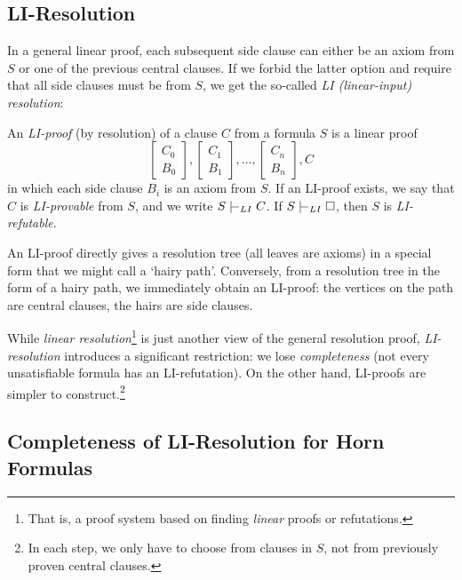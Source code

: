 \subsection{LI-Resolution}

In a general linear proof, each subsequent side clause can either be an axiom from $S$ or one of the previous central clauses. If we forbid the latter option and require that all side clauses must be from $S$, we get the so-called \emph{LI (linear-input) resolution}:
    
\begin{definition}[LI-Proof]
    An \emph{LI-proof} (by resolution) of a clause $C$ from a formula $S$ is a linear proof 
    $$
    \begin{bmatrix}
        C_0 \\
        B_0
    \end{bmatrix},
    \begin{bmatrix}
        C_1 \\
        B_1
    \end{bmatrix},\dots,
    \begin{bmatrix}
        C_n \\
        B_n
    \end{bmatrix},
    C
    $$
    in which each side clause $B_i$ is an axiom from $S$. If an LI-proof exists, we say that $C$ is \emph{LI-provable} from $S$, and we write $S\proves_{LI}C$. If $S\proves_{LI}\square$, then $S$ is \emph{LI-refutable}.
\end{definition}

\begin{remark}
    An LI-proof directly gives a resolution tree (all leaves are axioms) in a special form that we might call a `hairy path'. Conversely, from a resolution tree in the form of a hairy path, we immediately obtain an LI-proof: the vertices on the path are central clauses, the hairs are side clauses.
\end{remark}

While \emph{linear resolution}\footnote{That is, a proof system based on finding \emph{linear} proofs or refutations.} is just another view of the general resolution proof, \emph{LI-resolution} introduces a significant restriction: we lose \emph{completeness} (not every unsatisfiable formula has an LI-refutation). On the other hand, LI-proofs are simpler to construct.\footnote{In each step, we only have to choose from clauses in $S$, not from previously proven central clauses.} 

\subsection{Completeness of LI-Resolution for Horn Formulas}

